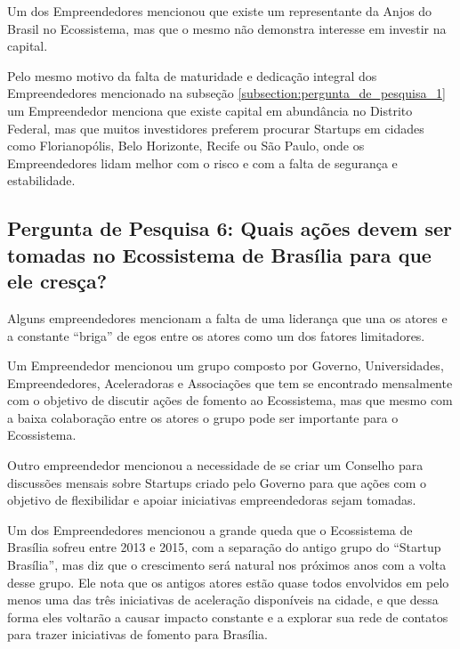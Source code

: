 Um dos Empreendedores mencionou que existe um representante da Anjos do Brasil no Ecossistema, mas que o mesmo não demonstra interesse em investir na capital.

Pelo mesmo motivo da falta de maturidade e dedicação integral dos Empreendedores mencionado na subseção \ref{subsection:pergunta_de_pesquisa_1} um Empreendedor menciona que existe capital em abundância no Distrito Federal, mas que muitos investidores preferem procurar Startups em cidades como Florianopólis, Belo Horizonte, Recife ou São Paulo, onde os Empreendedores lidam melhor com o risco e com a falta de segurança e estabilidade.

\subsection{Pergunta de Pesquisa 6: Quais ações devem ser tomadas no Ecossistema de Brasília para que ele cresça?}
\label{subsection:pergunta_de_pesquisa_6}

Alguns empreendedores mencionam a falta de uma liderança que una os atores e a constante ``briga'' de egos entre os atores como um dos fatores limitadores.

Um Empreendedor mencionou um grupo composto por Governo, Universidades, Empreendedores, Aceleradoras e Associações que tem se encontrado mensalmente com o objetivo de discutir ações de fomento ao Ecossistema, mas que mesmo com a baixa colaboração entre os atores o grupo pode ser importante para o Ecossistema. 

Outro empreendedor mencionou a necessidade de se criar um Conselho para discussões mensais sobre Startups criado pelo Governo para que ações com o objetivo de flexibilidar e apoiar iniciativas empreendedoras sejam tomadas.

Um dos Empreendedores mencionou a grande queda que o Ecossistema de Brasília sofreu entre 2013 e 2015, com a separação do antigo grupo do ``Startup Brasília'', mas diz que o crescimento será natural nos próximos anos com a volta desse grupo. Ele nota que os antigos atores estão quase todos envolvidos em pelo menos uma das três iniciativas de aceleração disponíveis na cidade, e que dessa forma eles voltarão a causar impacto constante e a explorar sua rede de contatos para trazer iniciativas de fomento para Brasília.